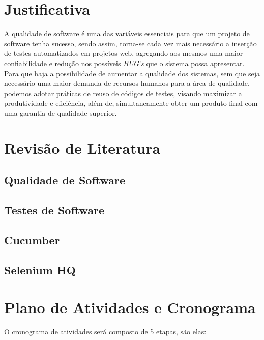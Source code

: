 \documentclass[12pt]{article}
\begin{document}
	\section{Justificativa}
	
	A qualidade de software  é uma das variáveis essenciais para que um projeto de software tenha sucesso,
	sendo assim, torna-se cada vez mais necessário a inserção de testes automatizados em projetos web,
	agregando aos mesmos uma maior confiabilidade e redução nos possíveis \emph{BUG's} que o sistema possa
	apresentar. Para que haja a possibilidade de aumentar a qualidade dos sistemas, sem que seja necessário uma maior
	demanda de recursos humanos para a área de qualidade, podemos adotar práticas de reuso de códigos de testes, visando
	maximizar a produtividade e eficiência, além de,  simultaneamente obter um produto final com uma garantia de qualidade
	superior.
	
	\section{Revisão de Literatura}
	
	\subsection{Qualidade de Software}

	\subsection{Testes de Software}
	
	\subsection{Cucumber}

	\subsection{Selenium HQ}
	
	\section{Plano de Atividades e Cronograma}

	O cronograma de atividades será composto de 5 etapas, são elas:
	
\end{document}
